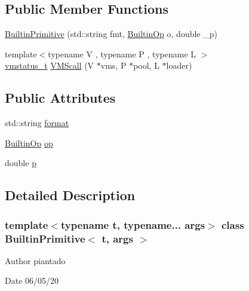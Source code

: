 \subsection*{Public Member Functions}
\begin{DoxyCompactItemize}
\item 
\hyperlink{struct_builtin_primitive_abad30dd239c26d27a2e6f1658aff9182}{Builtin\+Primitive} (std\+::string fmt, \hyperlink{_instruction_8h_af2fb7c87c5854c5733d7bb0506b06de7}{Builtin\+Op} o, double \+\_\+p)
\item 
{\footnotesize template$<$typename V , typename P , typename L $>$ }\\\hyperlink{_instruction_8h_a6202215407ab29590bb936ca2996cf64}{vmstatus\+\_\+t} \hyperlink{struct_builtin_primitive_a6403ebb7076028fa99751436768d6d81}{V\+M\+Scall} (V $\ast$vms, P $\ast$pool, L $\ast$loader)
\end{DoxyCompactItemize}
\subsection*{Public Attributes}
\begin{DoxyCompactItemize}
\item 
std\+::string \hyperlink{struct_builtin_primitive_aabf1561380f8c387cf3bf768f97bd4bd}{format}
\item 
\hyperlink{_instruction_8h_af2fb7c87c5854c5733d7bb0506b06de7}{Builtin\+Op} \hyperlink{struct_builtin_primitive_a996bd520f47a299728229774117d6188}{op}
\item 
double \hyperlink{struct_builtin_primitive_a1a8d8e62426c9454355412b80faf684c}{p}
\end{DoxyCompactItemize}


\subsection{Detailed Description}
\subsubsection*{template$<$typename t, typename... args$>$\newline
class Builtin\+Primitive$<$ t, args $>$}

\begin{DoxyAuthor}{Author}
piantado 
\end{DoxyAuthor}
\begin{DoxyDate}{Date}
06/05/20 
\end{DoxyDate}


